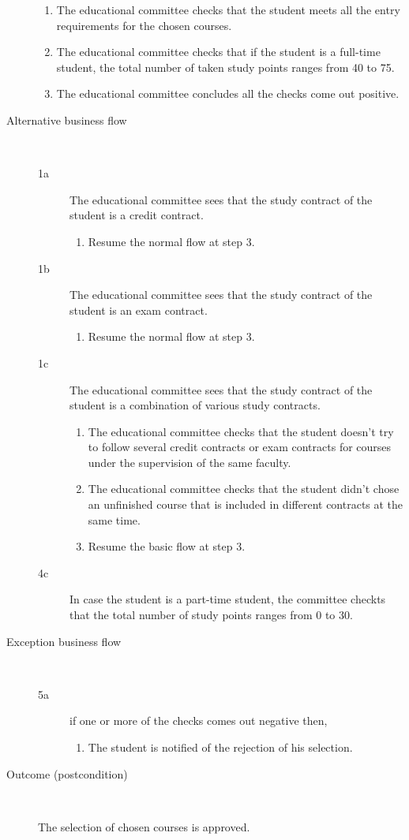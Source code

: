 \begin{description}
\begin{enumerate}
	  	\item The educational committee checks that the student meets all the entry
	  	requirements for the chosen courses.
	  	\item The educational committee checks that if the student is a full-time
	  	student, the total number of taken study points ranges from 40 to 75. 
	  	\item The educational committee concludes all the checks come out positive.
	\end{enumerate}
	\item[Alternative business flow] \
		\begin{description}
		\item[1a] The educational committee sees that the study contract of the
		student is a credit contract. 
			\begin{enumerate}
			  \item Resume the normal flow at step 3.
			\end{enumerate}
		\item[1b] The educational committee sees that the study contract of the
		student is an exam contract. 
			\begin{enumerate}
			  \item Resume the normal flow at step 3.
			\end{enumerate}
		\item[1c] The educational committee sees that the study contract of the
		student is a combination of various study contracts.
			\begin{enumerate}
			  \item The educational committee checks that the student doesn't try to
			  follow several credit contracts or exam contracts for courses under the
			  supervision of the same faculty.
			  \item The educational committee checks that the student didn't chose
			  an unfinished course that is included in different contracts at the same
			  time.
			  \item Resume the basic flow at step 3.
			\end{enumerate}
		\item[4c] In case the student is a part-time student, the committee checkts
		that the total number of study points ranges from 0 to 30.
		\end{description}
		
	\item[Exception business flow] \ 
	\begin{description}
		\item[5a] if one or more of the checks comes out negative then,
		\begin{enumerate}
		  \item The student is notified of the rejection of his selection.
		\end{enumerate}
	\end{description}
	\item[Outcome (postcondition)] \ 
		\par The selection of chosen courses is approved.
\end{description}
